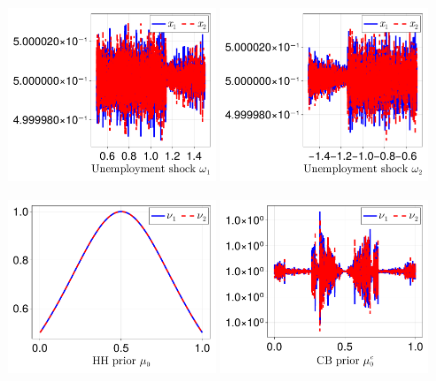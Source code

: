 \documentclass[12pt,a4paper]{article}
\begin{document}
\begin{figure}[H]
\centering
\includegraphics[width=0.49\textwidth]{figures/V9/γ_1/fig_optimal_x_ω_1.pdf}
\includegraphics[width=0.49\textwidth]{figures/V9/γ_1/fig_optimal_x_ω_2.pdf}
\end{figure}

\begin{figure}[H]
\centering
\includegraphics[width=0.49\textwidth]{figures/V9/γ=1.0-μ_0=0.5-α=0.0/fig_optimal_ν_by_μ_0.pdf}
\includegraphics[width=0.49\textwidth]{figures/V9/γ=1.0-μ_0=0.5-α=0.0/fig_optimal_ν_by_μ_0_c.pdf}
\end{figure}
\end{document}

